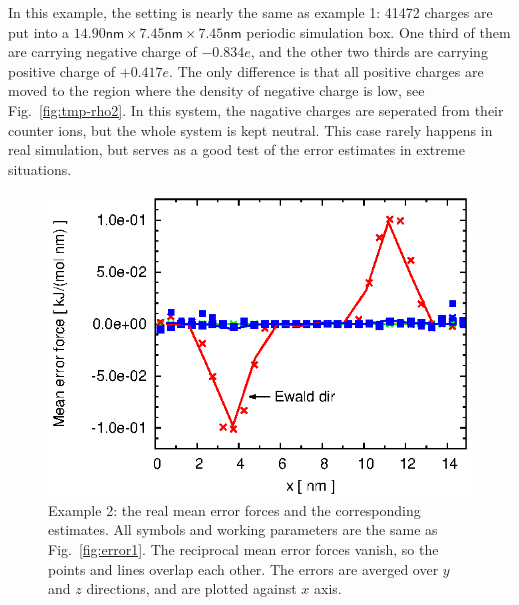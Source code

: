 \documentclass[aps,pre,preprint]{revtex4}
\begin{document}
In this example, the setting is nearly the same as
example 1: 41472 charges are put into a
$14.90\textsf{nm}\times 7.45\textsf{nm}\times 7.45\textsf{nm}$
periodic simulation box. One third of them are carrying negative
charge of $-0.834e$, and the other two thirds are carrying positive
charge of $+0.417e$.  The only difference is that all positive charges
are moved to the region where the density of negative charge is low,
see Fig.~\ref{fig:tmp-rho2}.
In this system, the nagative charges are seperated from their
counter ions, but the whole system is kept neutral. This case rarely
happens in real simulation, but serves as a good test of the error
estimates in extreme situations.

\begin{figure}
  \centering
  \includegraphics[]{fig.new/fig.rand2.meanf.eps}
  \caption{
    Example 2: the real mean error forces and the corresponding
    estimates. All symbols and working parameters are the same
    as     Fig.~\ref{fig:error1}.
    The reciprocal mean error forces vanish, so the points and lines
    overlap each other. 
    The errors are averged over $y$ and $z$ directions, and are
    plotted against $x$ axis.
    }
  \label{fig:meanf2}
\end{figure}
\end{document}
